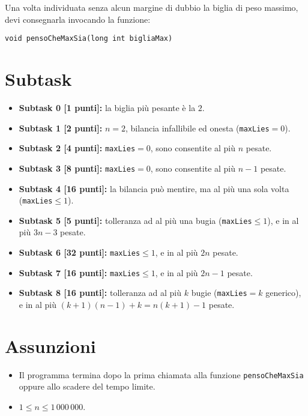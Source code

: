 \documentclass[a4paper,11pt]{article}
\begin{document}
  \noindent
  Una volta individuata senza alcun margine di dubbio la biglia di peso massimo,
  devi consegnarla invocando la funzione:
  
  \vspace{0.2cm}
  
  \noindent
  \texttt{void pensoCheMaxSia(long int bigliaMax)}
  
  
  \section*{Subtask}
  \begin{itemize}
    \item \textbf{Subtask 0 [1 punti]:} la biglia pi\`u pesante è la $2$.
    \item \textbf{Subtask 1 [2 punti]:} $n=2$, bilancia infallibile ed onesta (\texttt{maxLies}$= 0$).
    \item \textbf{Subtask 2 [4 punti]:} \texttt{maxLies}$= 0$, sono consentite al pi\`u $n$ pesate.
    \item \textbf{Subtask 3 [8 punti]:} \texttt{maxLies}$= 0$, sono consentite al pi\`u $n-1$ pesate.
    \item \textbf{Subtask 4 [16 punti]:} la bilancia pu\`o mentire, ma al pi\`u una sola volta (\texttt{maxLies}$\leq 1$).
    \item \textbf{Subtask 5 [5 punti]:} tolleranza ad al pi\`u una bugia (\texttt{maxLies}$\leq 1$), e in al pi\`u $3n-3$ pesate.
    \item \textbf{Subtask 6 [32 punti]:} \texttt{maxLies}$\leq 1$, e in al pi\`u $2n$ pesate.
    \item \textbf{Subtask 7 [16 punti]:} \texttt{maxLies}$\leq 1$, e in al pi\`u $2n-1$ pesate.
    \item \textbf{Subtask 8 [16 punti]:} tolleranza ad al pi\`u $k$ bugie (\texttt{maxLies}$= k$ generico), e in al pi\`u $(k+1)(n-1) +k = n(k+1)-1$ pesate.
  \end{itemize}
  
  \section*{Assunzioni}
  \begin{itemize}[nolistsep, noitemsep]
    \item Il programma termina dopo la prima chiamata alla funzione \texttt{pensoCheMaxSia} oppure allo scadere del tempo limite.
    \item $1 \le n \le 1\,000\,000$.
  \end{itemize}
\end{document}
